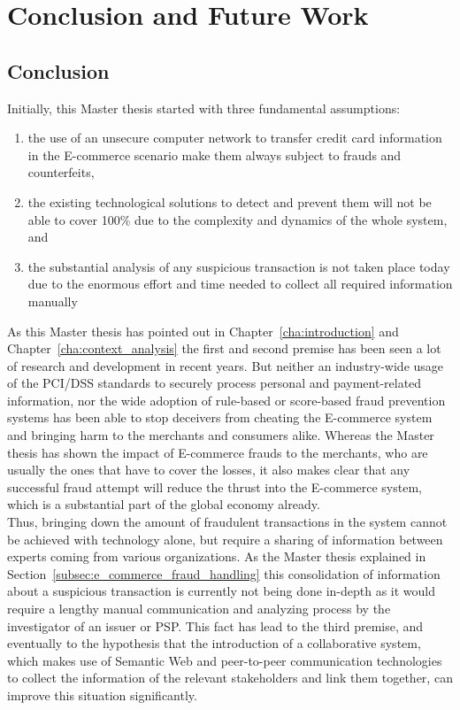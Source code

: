 
\chapter{Conclusion and Future Work} %
\label{cha:conclusion}

\section{Conclusion}
\label{sec:conclusion}

Initially, this Master thesis started with three fundamental assumptions: \@

\begin{enumerate}
	\item the use of an unsecure computer network to transfer credit card information in the \gls{E-commerce} scenario make them always subject to frauds and counterfeits,
	\item the existing technological solutions to detect and prevent them will not be able to cover 100\% due to the complexity and dynamics of the whole system, and
	\item the substantial analysis of any suspicious transaction is not taken place today due to the enormous effort and time needed to collect all required information manually
\end{enumerate}

As this Master thesis has pointed out in Chapter~\ref{cha:introduction} and Chapter~\ref{cha:context_analysis} the first and second premise has been seen a lot of research and development in recent years. But neither an industry-wide usage of the \gls{PCI/DSS} standards to securely process personal and payment-related information, nor the wide adoption of rule-based or score-based fraud prevention systems has been able to stop deceivers from cheating the \gls{E-commerce} system and bringing harm to the merchants and consumers alike. Whereas the Master thesis has shown the impact of \gls{E-commerce} frauds to the merchants, who are usually the ones that have to cover the losses, it also makes clear that any successful fraud attempt will reduce the thrust into the \gls{E-commerce} system, which is a substantial part of the global economy already. \\

Thus, bringing down the amount of fraudulent transactions in the system cannot be achieved with technology alone, but require a sharing of information between experts coming from various organizations. As the Master thesis explained in Section~\ref{subsec:e_commerce_fraud_handling} this consolidation of information about a suspicious transaction is currently not being done in-depth as it would require a lengthy manual communication and analyzing process by the investigator of an issuer or \gls{PSP}. This fact has lead to the third premise, and eventually to the hypothesis that the introduction of a collaborative system, which makes use of Semantic Web and peer-to-peer communication technologies to collect the information of the relevant stakeholders and link them together, can improve this situation significantly. \\

